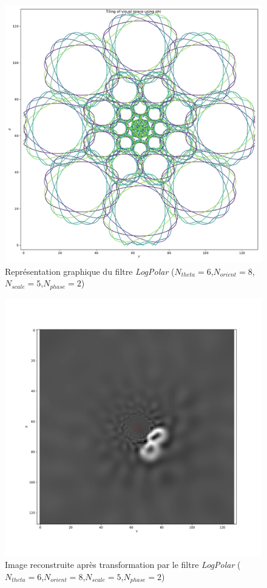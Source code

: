 \begin{figure}[th]
\centering
\includegraphics[scale=0.35]{Figures/LogPolar_shape}
\decoRule %
\caption[Figure]{Représentation graphique du filtre \textit{LogPolar} ($N_{theta}=6$,$N_{orient}=8$,$N_{scale}=5$,$N_{phase}=2$) }
\label{fig:LogPolar_shape}
\end{figure}

\begin{figure}[th]
\centering
\includegraphics[scale=0.35]{Figures/LogPolar_effect}
\decoRule %
\caption[Figure]{Image reconstruite après transformation par le filtre \textit{LogPolar} ($N_{theta}=6$,$N_{orient}=8$,$N_{scale}=5$,$N_{phase}=2$) }
\label{fig:LogPolar_effect}
\end{figure}

